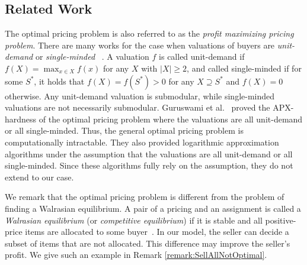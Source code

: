 \documentclass[letterpaper]{article}
\theoremstyle{definition}
\newcommand{\COMM}[2]{{
\begin{CJK}{UTF8}{ipxm}
\ifthenelse{\equal{#1}{TM}}{\color{blue}}{
\ifthenelse{\equal{#1}{YK}}{\color{red}}{
\ifthenelse{\equal{#1}{HS}}{\color{cyan}}{
\ifthenelse{\equal{#1}{KK}}{\color{magenta}}}}}
[#1: #2]
\end{CJK}
}}
\begin{document}
\subsection{Related Work}
\label{sec:relatedwork}

The optimal pricing problem is also referred to as the \emph{profit maximizing pricing problem}. 
There are many works for the case when valuations of buyers are \emph{unit-demand} or \emph{single-minded}~
\cite{aggarwal2004algorithms,goldberg2003envy,goldberg2001competitive,guruswami2005profit,cheung2008approximation,anshelevich2015envy}. 
A valuation $f$ is called unit-demand if $f(X)=\max_{x \in X} f(x)$ for any $X$ with $|X| \geq 2$, and called single-minded if for some $S^*$, it holds that $f(X)=f(S^*) > 0$ for any $X \supseteq S^*$ and $f(X)=0$ otherwise. 
Any unit-demand valuation is submodular, while single-minded valuations are not necessarily submodular.  
Guruswami et al.~ proved the APX-hardness of the optimal pricing problem where the valuations are all unit-demand or all single-minded.
Thus, the general optimal pricing problem is computationally intractable.
They also provided logarithmic approximation algorithms under the assumption that the valuations are all unit-demand or all single-minded. 
Since these algorithms fully rely on the assumption, they do not extend to our case. 

We remark that the optimal pricing problem is different from the problem of finding a Walrasian equilibrium.
A pair of a pricing and an assignment is called a \emph{Walrasian equilibrium} (or \emph{competitive equilibrium}) if it is stable and all positive-price items are allocated to some buyer~\cite{nisan2007algorithmic11}.
In our model, the seller can decide a subset of items that are not allocated.
This difference may improve the seller's profit. 
We give such an example in Remark \ref{remark:SellAllNotOptimal}.
\end{document}
